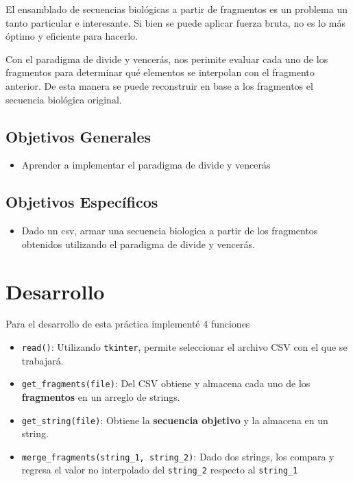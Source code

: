 \documentclass[12pt, a4paper]{article} %
\begin{document}
El ensamblado de secuencias biológicas a partir de fragmentos es un problema un tanto particular e interesante. Si bien se puede aplicar fuerza bruta, no es lo más óptimo y eficiente para hacerlo.

Con el paradigma de divide y vencerás, nos perimite evaluar cada uno de los fragmentos para determinar qué elementos se interpolan con el fragmento anterior. De esta manera se puede reconstruir en base a los fragmentos el secuencia biológica original.

\subsection{Objetivos Generales}

\begin{itemize}
	\item Aprender a implementar el paradigma de divide y vencerás
\end{itemize}

\subsection{Objetivos Específicos}

\begin{itemize}
	\item Dado un csv, armar una secuencia biologica a partir de los fragmentos obtenidos utilizando el paradigma de divide y vencerás.
\end{itemize}

\section{Desarrollo}

Para el desarrollo de esta práctica implementé 4 funciones

\begin{itemize}
	\item \texttt{read()}: Utilizando \texttt{tkinter}, permite seleccionar el archivo CSV con el que se trabajará.
	\item \texttt{get\_fragments(file)}: Del CSV obtiene y almacena cada uno de los \textbf{fragmentos} en un arreglo de strings.
	\item \texttt{get\_string(file)}: Obtiene la \textbf{secuencia objetivo} y la almacena en un string.
	\item \texttt{merge\_fragments(string\_1, string\_2)}: Dado dos strings, los compara y regresa el valor no interpolado del \texttt{string\_2} respecto al \texttt{string\_1}
\end{itemize}
\end{document}
